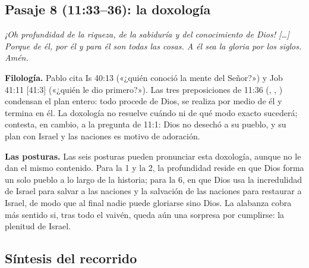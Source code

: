 \subsection{Pasaje 8 (11:33--36): la doxología}

\begin{cita}[fontupper=\upshape]
\par\smallskip
\itshape ¡Oh profundidad de la riqueza, de la sabiduría y del conocimiento de Dios! [\ldots] Porque de él, por él y para él son todas las cosas. A él sea la gloria por los siglos. Amén.
\end{cita}

\textbf{Filología.} Pablo cita Is 40:13 («¿quién conoció la mente del Señor?») y Job 41:11 [41:3] («¿quién le dio primero?»). Las tres preposiciones de 11:36 (, , ) condensan el plan entero: todo procede de Dios, se realiza por medio de él y termina en él. La doxología no resuelve cuándo ni de qué modo exacto sucederá; contesta, en cambio, a la pregunta de 11:1: Dios no desechó a su pueblo, y su plan con Israel y las naciones es motivo de adoración.

\textbf{Las posturas.} Las seis posturas pueden pronunciar esta doxología, aunque no le dan el mismo contenido. Para la 1 y la 2, la profundidad reside en que Dios forma un solo pueblo a lo largo de la historia; para la 6, en que Dios usa la incredulidad de Israel para salvar a las naciones y la salvación de las naciones para restaurar a Israel, de modo que al final nadie puede gloriarse sino Dios. La alabanza cobra más sentido si, tras todo el vaivén, queda aún una sorpresa por cumplirse: la plenitud de Israel.

\subsection{Síntesis del recorrido}

